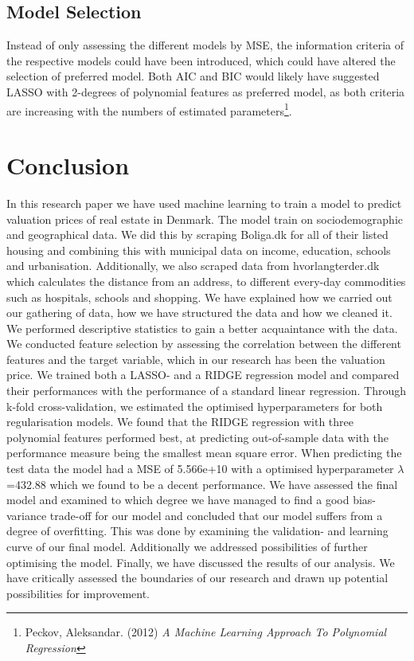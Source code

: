 \documentclass[12pt,a4paper]{article}
\begin{document}
\subsection{Model Selection}
Instead of only assessing the different models by MSE,
the information criteria of the respective models could have been introduced, which could have altered the selection of preferred model. Both AIC and BIC would likely have suggested LASSO with 2-degrees of polynomial features as preferred model, as both criteria are increasing with the numbers of estimated parameters\footnote{Peckov, Aleksandar. (2012)  \textit{A Machine Learning Approach To Polynomial Regression}}. 

\section{Conclusion}
In this research paper we have used machine learning to train a model to predict valuation prices of real estate in Denmark. The model train on sociodemographic and geographical data. \newline We did this by scraping Boliga.dk for all of their listed housing and combining this with municipal data on income, education, schools and urbanisation. Additionally, we also scraped data from hvorlangterder.dk which calculates the distance from an address, to different every-day commodities such as hospitals, schools and shopping. 
We have explained how we carried out our gathering of data, how we have structured the data and how we cleaned it. \newline
We performed descriptive statistics to gain a better acquaintance with the data. 
We conducted feature selection by assessing the correlation between the different features and the target variable, which in our research has been the valuation price. 
We trained both a LASSO- and a RIDGE regression model and compared their performances with the performance of a standard linear regression. Through k-fold cross-validation, we estimated the optimised hyperparameters for both regularisation models. We found that the RIDGE regression with three polynomial features performed best, at predicting out-of-sample data with the performance measure being the smallest mean square error. When predicting the test data the model had a MSE of 5.566e+10 with a optimised hyperparameter $\lambda$=432.88 which we found to be a decent performance. 
We have assessed the final model and examined to which degree we have managed to find a good bias-variance trade-off for our model and concluded that our model suffers from a degree of overfitting. This was done by examining the validation- and learning curve of our final model. Additionally we addressed possibilities of further optimising the model.  \newline
Finally, we have discussed the results of our analysis. We have critically assessed the boundaries of our research and drawn up potential possibilities for improvement. 
\end{document}
